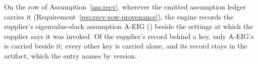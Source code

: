 
\begin{requirement}\label{req:supplier-eig-record}
On the row of Assumption~\ref{ass:recv}, wherever the emitted assumption
ledger  carries it
(Requirement~\ref{req:recv-row-provenance}), the engine records the
supplier's eigenvalue-slack assumption A-EIG ()
beside the settings at which the supplier says it was invoked. Of the supplier's record behind a key, only A-EIG's is carried
beside it; every other key is carried alone, and its record stays in the
artifact, which the entry names by version.
\end{requirement}

